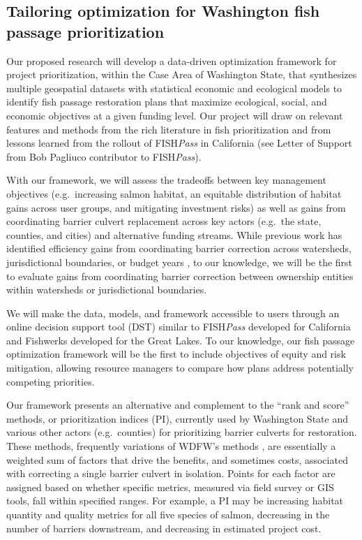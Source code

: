 \documentclass[12pt]{elsarticle}
\begin{document}
\subsection*{Tailoring optimization for Washington fish passage prioritization}

Our proposed research will develop a data-driven optimization framework for project prioritization, within the Case Area of Washington State, that synthesizes multiple geospatial datasets with statistical economic and ecological models to identify fish passage restoration plans that maximize ecological, social, and economic objectives at a given funding level. Our project will draw on relevant features and methods from the rich literature in fish prioritization and from lessons learned from the rollout of FISH\emph{Pass} in California (see Letter of Support from Bob Pagliuco contributor to FISH\emph{Pass}).

With our framework, we will assess the tradeoffs between key management objectives (e.g.\ increasing salmon habitat, an equitable distribution of habitat gains across user groups, and mitigating investment risks) as well as gains from coordinating barrier culvert replacement across key actors (e.g.\ the state, counties, and cities) and alternative funding streams. While previous work has identified efficiency gains from coordinating barrier correction across watersheds, jurisdictional boundaries, or budget years \citep{neeson_enhancing_2015,milt_local-scale_2017}, to our knowledge, we will be the first to evaluate gains from coordinating barrier correction between ownership entities within watersheds or jurisdictional boundaries.

We will make the data, models, and framework accessible to users through an online decision support tool (DST) similar to FISH\emph{Pass} developed for California and Fishwerks developed for the Great Lakes. To our knowledge, our fish passage optimization framework will be the first to include objectives of equity and risk mitigation, allowing resource managers to compare how plans address potentially competing priorities. 

Our framework presents an alternative and complement to the ``rank and score'' methods, or prioritization indices (PI), currently used by Washington State and various other actors (e.g.\ counties) for prioritizing barrier culverts for restoration. These methods, frequently variations of WDFW's methods \citep{noauthor_fish_2019}, are essentially a weighted sum of factors that drive the benefits, and sometimes costs, associated with correcting a single barrier culvert in isolation. Points for each factor are assigned based on whether specific metrics, measured via field survey or GIS tools, fall within specified ranges. For example, a PI may be increasing habitat quantity and quality metrics for all five species of salmon, decreasing in the number of barriers downstream, and decreasing in estimated project cost. 
\end{document}

